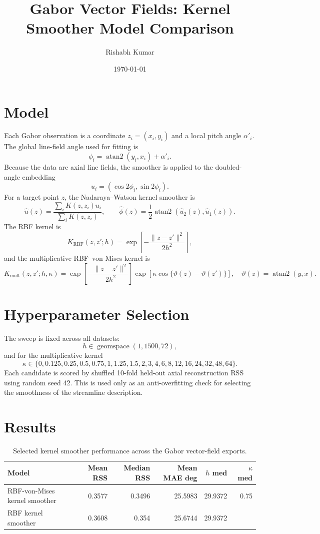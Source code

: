 \documentclass[10pt]{article}
\title{Gabor Vector Fields: Kernel Smoother Model Comparison}
\author{Rishabh Kumar}
\date{\today}
\begin{document}
\maketitle

\section{Model}
Each Gabor observation is a coordinate $z_i=(x_i,y_i)$ and a local pitch angle $\alpha'_i$. The global line-field angle used for fitting is
\[
  \phi_i=\operatorname{atan2}(y_i,x_i)+\alpha'_i.
\]
Because the data are axial line fields, the smoother is applied to the doubled-angle embedding
\[
  u_i=(\cos 2\phi_i,\sin 2\phi_i).
\]
For a target point $z$, the Nadaraya--Watson kernel smoother is
\[
  \hat u(z)=\frac{\sum_i K(z,z_i)u_i}{\sum_i K(z,z_i)},
  \qquad
  \hat\phi(z)=\frac12\operatorname{atan2}(\hat u_2(z),\hat u_1(z)).
\]
The RBF kernel is
\[
  K_{\mathrm{RBF}}(z,z';h)=
  \exp\left[-\frac{\|z-z'\|^2}{2h^2}\right],
\]
and the multiplicative RBF--von-Mises kernel is
\[
  K_{\mathrm{mult}}(z,z';h,\kappa)=
  \exp\left[-\frac{\|z-z'\|^2}{2h^2}\right]
  \exp\left[\kappa\cos\{\vartheta(z)-\vartheta(z')\}\right],
  \quad
  \vartheta(z)=\operatorname{atan2}(y,x).
\]

\section{Hyperparameter Selection}
The sweep is fixed across all datasets:
\[
  h\in \operatorname{geomspace}(1,1500,72),
\]
and for the multiplicative kernel
\[
  \kappa\in
  \{0,0.125,0.25,0.5,0.75,1,1.25,1.5,2,3,4,6,8,12,16,24,32,48,64\}.
\]
Each candidate is scored by shuffled 10-fold held-out axial reconstruction RSS using random seed 42. This is used only as an anti-overfitting check for selecting the smoothness of the streamline description.

\section{Results}
\begin{table}[h!]
\centering
\small
\begin{tabular}{lrrrrr}
\toprule
Model & Mean RSS & Median RSS & Mean MAE deg & $h$ med & $\kappa$ med \\
\midrule
RBF-von-Mises kernel smoother & 0.3577 & 0.3496 & 25.5983 & 29.9372 & 0.75 \\
RBF kernel smoother & 0.3608 & 0.354 & 25.6744 & 29.9372 &  \\
\bottomrule
\end{tabular}
\caption{Selected kernel smoother performance across the Gabor vector-field exports.}
\end{table}
\end{document}
